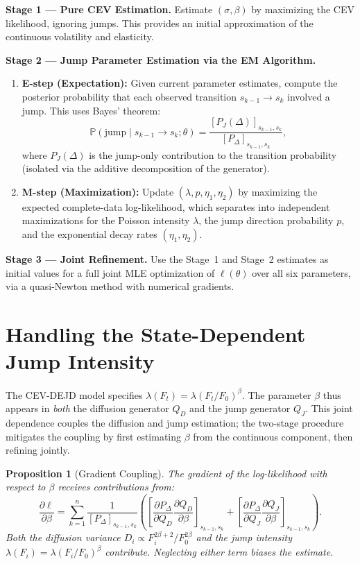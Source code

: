 \documentclass[11pt,a4paper,openany]{book}
\theoremstyle{definition}
\theoremstyle{plain}
\newtheorem{proposition}[theorem]{Proposition}
\theoremstyle{remark}
\newcommand{\1}{\mathbbm{1}}
\newcommand{\Pbb}{\mathbb{P}}
\begin{document}
\textbf{Stage 1 --- Pure CEV Estimation.} Estimate $(\sigma, \beta)$ by maximizing the CEV likelihood, ignoring jumps. This provides an initial approximation of the continuous volatility and elasticity.

\textbf{Stage 2 --- Jump Parameter Estimation via the EM Algorithm.}
\begin{enumerate}[label=(\arabic*)]
    \item \textbf{E-step (Expectation):} Given current parameter estimates, compute the posterior probability that each observed transition $s_{k-1} \to s_{k}$ involved a jump. This uses Bayes' theorem:
    \[
    \Pbb(\text{jump} \mid s_{k-1} \to s_{k}; \theta) = \frac{[P_{J}(\Delta)]_{s_{k-1}, s_{k}}}{[P_{\Delta}]_{s_{k-1}, s_{k}}},
    \]
    where $P_{J}(\Delta)$ is the jump-only contribution to the transition probability (isolated via the additive decomposition of the generator).

    \item \textbf{M-step (Maximization):} Update $(\lambda, p, \eta_{1}, \eta_{2})$ by maximizing the expected complete-data log-likelihood, which separates into independent maximizations for the Poisson intensity $\lambda$, the jump direction probability $p$, and the exponential decay rates $(\eta_{1}, \eta_{2})$.
\end{enumerate}

\textbf{Stage 3 --- Joint Refinement.} Use the Stage~1 and Stage~2 estimates as initial values for a full joint MLE optimization of $\ell(\theta)$ over all six parameters, via a quasi-Newton method with numerical gradients.

\section{Handling the State-Dependent Jump Intensity}

The CEV-DEJD model specifies $\lambda(F_{t}) = \lambda (F_{t}/F_{0})^{\beta}$. The parameter $\beta$ thus appears in \emph{both} the diffusion generator $Q_{D}$ and the jump generator $Q_{J}$. This joint dependence couples the diffusion and jump estimation; the two-stage procedure mitigates the coupling by first estimating $\beta$ from the continuous component, then refining jointly.

\begin{proposition}[Gradient Coupling]
The gradient of the log-likelihood with respect to $\beta$ receives contributions from:
\[
\frac{\partial \ell}{\partial \beta} = \sum_{k=1}^{n} \frac{1}{[P_{\Delta}]_{s_{k-1}, s_{k}}} \left( \left[\frac{\partial P_{\Delta}}{\partial Q_{D}} \frac{\partial Q_{D}}{\partial \beta}\right]_{s_{k-1}, s_{k}} + \left[\frac{\partial P_{\Delta}}{\partial Q_{J}} \frac{\partial Q_{J}}{\partial \beta}\right]_{s_{k-1}, s_{k}} \right).
\]
Both the diffusion variance $D_{i} \propto F_{i}^{2\beta+2} / F_{0}^{2\beta}$ and the jump intensity $\lambda(F_{i}) = \lambda (F_{i}/F_{0})^{\beta}$ contribute. Neglecting either term biases the estimate.
\end{proposition}
\end{document}
